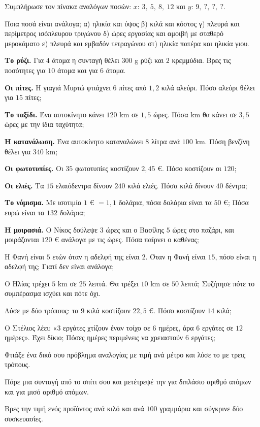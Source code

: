 \ex Συμπλήρωσε τον πίνακα αναλόγων ποσών: $x$: $3,\ 5,\ 8,\ 12$ και $y$: $9,\ ?,\ ?,\ ?$.

\ex Ποια ποσά είναι ανάλογα; α) ηλικία και ύψος \quad β) κιλά και κόστος \quad γ) πλευρά και περίμετρος ισόπλευρου τριγώνου \quad δ) ώρες εργασίας και αμοιβή με σταθερό μεροκάματο \quad ε) πλευρά και εμβαδόν τετραγώνου \quad στ) ηλικία πατέρα και ηλικία γιου.


\ex \textbf{Το ρύζι.} Για $4$ άτομα η συνταγή θέλει $300$ g ρύζι και $2$ κρεμμύδια. Βρες τις ποσότητες για $10$ άτομα και για $6$ άτομα.

\ex \textbf{Οι πίτες.} Η γιαγιά Μυρτώ φτιάχνει $6$ πίτες από $1{,}2$ κιλά αλεύρι. Πόσο αλεύρι θέλει για $15$ πίτες;

\ex \textbf{Το ταξίδι.} Ένα αυτοκίνητο κάνει $120$ km σε $1{,}5$ ώρες. Πόσα km θα κάνει σε $3{,}5$ ώρες με την ίδια ταχύτητα;

\ex \textbf{Η κατανάλωση.} Ένα αυτοκίνητο καταναλώνει $8$ λίτρα ανά $100$ km. Πόση βενζίνη θέλει για $340$ km;

\ex \textbf{Οι φωτοτυπίες.} Οι $35$ φωτοτυπίες κοστίζουν $2{,}45$ €. Πόσο κοστίζουν οι $120$;

\ex \textbf{Οι ελιές.} Τα $15$ ελαιόδεντρα δίνουν $240$ κιλά ελιές. Πόσα κιλά δίνουν $40$ δέντρα;

\ex \textbf{Το νόμισμα.} Με ισοτιμία $1$ € $=1{,}1$ δολάρια, πόσα δολάρια είναι τα $50$ €; Πόσα ευρώ είναι τα $132$ δολάρια;

\ex \textbf{Η μοιρασιά.} Ο Νίκος δούλεψε $3$ ώρες και ο Βασίλης $5$ ώρες στο παζάρι, και μοιράζονται $120$ € ανάλογα με τις ώρες. Πόσα παίρνει ο καθένας;


\ex Η Φανή είναι $5$ ετών όταν η αδελφή της είναι $2$. Όταν η Φανή είναι $15$, πόσο είναι η αδελφή της; Γιατί δεν είναι ανάλογα;

\ex Ο Ηλίας τρέχει $5$ km σε $25$ λεπτά. Θα τρέξει $10$ km σε $50$ λεπτά; Συζήτησε πότε το συμπέρασμα ισχύει και πότε όχι.

\ex Λύσε με δύο τρόπους: τα $9$ κιλά κοστίζουν $22{,}5$ €. Πόσο κοστίζουν $14$ κιλά;

\ex Ο Στέλιος λέει: «$3$ εργάτες χτίζουν έναν τοίχο σε $6$ ημέρες, άρα $6$ εργάτες σε $12$ ημέρες». Έχει δίκιο; Πόσες ημέρες περιμένεις να χρειαστούν $6$ εργάτες;

\ex Φτιάξε ένα δικό σου πρόβλημα αναλογίας με τιμή ανά μέτρο και λύσε το με τρεις τρόπους.


\ex Πάρε μια συνταγή από το σπίτι σου και μετέτρεψέ την για διπλάσιο αριθμό ατόμων και για μισό αριθμό ατόμων.

\ex Βρες την τιμή ενός προϊόντος ανά κιλό και ανά $100$ γραμμάρια και σύγκρινε δύο συσκευασίες.
